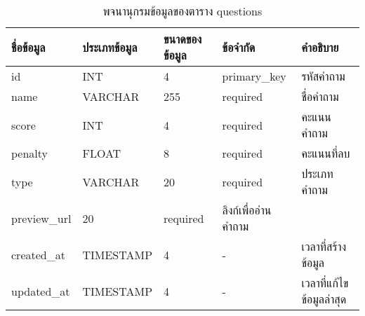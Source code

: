 \begin{table}[H]
    \caption{พจนานุกรมข้อมูลของตาราง questions}
    \label{tab:database-questions}
    \begin{tabularx}{\textwidth}{ | p{2.25cm} | p{2.20cm} | p{2.45cm} | p{2cm} | X | }
    \hline
    \textbf{ชื่อข้อมูล} & \textbf{ประเภทข้อมูล} & \textbf{ขนาดของข้อมูล} & \textbf{ข้อจำกัด} & \textbf{คำอธิบาย} \\
    \hline
    id & INT & 4 & primary\_key & รหัสคำถาม \\
    \hline
    name & VARCHAR & 255 & required & ชื่อคำถาม \\
    \hline
    score & INT & 4 & required & คะแนนคำถาม \\
    \hline
    penalty & FLOAT & 8 & required & คะแนนที่ลบ \\
    \hline
    type & VARCHAR & 20 & required & ประเภทคำถาม \\
    \hline
    preview\_url & 20 & required & ลิงก์เพื่ออ่านคำถาม \\
    \hline
    created\_at & TIMESTAMP & 4 & - & เวลาที่สร้างข้อมูล \\
    \hline
    updated\_at & TIMESTAMP & 4 & - & เวลาที่แก้ไขข้อมูลล่าสุด \\
    \hline
    \end{tabularx}
\end{table}